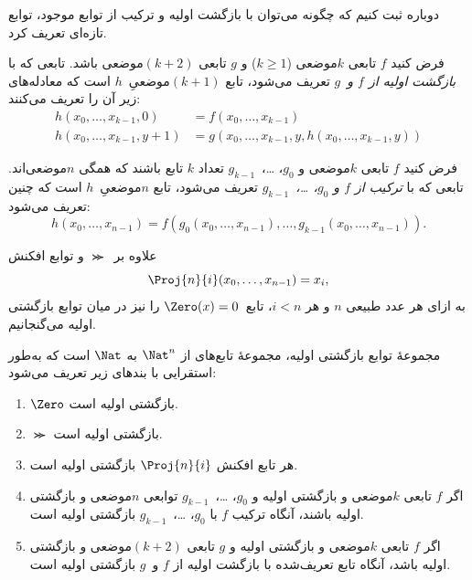 \documentclass[../../../include/open-logic-section]{subfiles}
\begin{document}

دوباره ثبت کنیم که چگونه می‌توان با بازگشت اولیه و ترکیب از توابع
موجود، توابع تازه‌ای تعریف کرد.

\begin{defn}
   فرض کنید $f$ تابعی $k$موضعی
  ($k\ge 1$) و $g$ تابعی $(k+2)$موضعی باشد. تابعی که با
  \emph{بازگشت اولیه از $f$ و~$g$} تعریف می‌شود، تابع
  $(k+1)$موضعیِ~$h$ است که معادله‌های زیر آن را تعریف می‌کنند:
  \begin{align*}
    h(x_0,\dots,x_{k-1},0) & =  f(x_0,\dots,x_{k-1}) \\
    h(x_0,\dots,x_{k-1},y+1) & = g(x_0,\dots,x_{k-1}, y, h(x_0,\dots,x_{k-1}, y))
  \end{align*}
\end{defn}

\begin{defn}
   فرض کنید $f$ تابعی $k$موضعی و
  $g_0$، \dots،~$g_{k-1}$ تعداد $k$ تابع باشند که همگی $n$موضعی‌اند.
  تابعی که با \emph{ترکیب از $f$ و
  $g_0$، \dots،~$g_{k-1}$} تعریف می‌شود، تابع $n$موضعیِ~$h$ است که
  چنین تعریف می‌شود:
  \[
  h(x_0, \dots, x_{n-1}) =
  f(g_0(x_0, \dots, x_{n-1}), \dots, g_{k-1}(x_0, \dots, x_{n-1})).
  \]
\end{defn}

علاوه بر~$\Succ$ و توابع افکنش
\[
\Proj{n}{i}(x_0,\dots,x_{n-1}) = x_i,
\]
به ازای هر عدد طبیعی $n$ و هر $i<n$، تابع~$\Zero(x)=0$ را نیز در
میان توابع بازگشتی اولیه می‌گنجانیم.

\begin{defn}
  مجموعهٔ توابع بازگشتی اولیه، مجموعهٔ تابع‌های از $\Nat^n$ به
  $\Nat$ است که به‌طور استقرایی با بندهای زیر تعریف می‌شود:
  \begin{enumerate}
  \item $\Zero$ بازگشتی اولیه است.
  \item $\Succ$ بازگشتی اولیه است.
  \item هر تابع افکنش $\Proj{n}{i}$ بازگشتی اولیه است.
  \item اگر $f$ تابعی $k$موضعی و بازگشتی اولیه و
    $g_0$، \dots،~$g_{k-1}$ توابعی $n$موضعی و بازگشتی اولیه باشند،
    آنگاه ترکیب $f$ با $g_0$، \dots،~$g_{k-1}$ بازگشتی اولیه است.
  \item اگر $f$ تابعی $k$موضعی و بازگشتی اولیه و $g$ تابعی
    $(k+2)$موضعی و بازگشتی اولیه باشد، آنگاه تابع تعریف‌شده با بازگشت
    اولیه از $f$ و~$g$ بازگشتی اولیه است.
\end{enumerate}
\end{defn}
\end{document}
